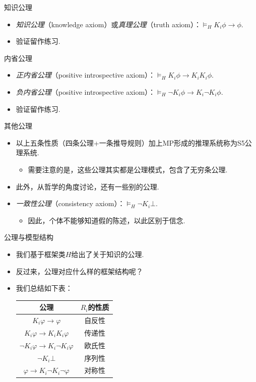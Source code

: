 \begin{frame}{知识公理}
\begin{itemize}
    \item \emph{知识公理}（knowledge axiom）或\emph{真理公理}（truth axiom）：$\vDash_H K_i\phi\to\phi$.
    \item 验证留作练习. %
\end{itemize}
\end{frame}
\begin{frame}{内省公理}
\begin{itemize}
    \item \emph{正内省公理}（positive introspective axiom）：$\vDash_H K_i\phi\to K_iK_i\phi$.
    \item \emph{负内省公理}（positive introspective axiom）：$\vDash_H \neg K_i\phi\to K_i\neg K_i\phi$.
    \item 验证留作练习. %
\end{itemize}
\end{frame}
\begin{frame}{其他公理}
\begin{itemize}
    \item 以上五条性质（四条公理+一条推导规则）加上MP形成的推理系统称为S5公理系统.
    \begin{itemize}
        \item 需要注意的是，这些公理其实都是公理模式，包含了无穷条公理.
    \end{itemize}
    \item 此外，从哲学的角度讨论，还有一些别的公理.
    \item \emph{一致性公理}（consistency axiom）：$\vDash_H\neg K_i\bot$.
    \begin{itemize}
        \item 因此，个体不能够知道假的陈述，以此区别于信念.
    \end{itemize}
\end{itemize}
\end{frame}
\begin{frame}{公理与模型结构}
\begin{itemize}
    \item 我们基于框架类$H$给出了关于知识的公理.
    \item 反过来，公理对应什么样的框架结构呢？
    \item 我们总结如下表：
    \begin{table}[ht]
        \centering
       \begin{tabular}{cc}
\toprule 公理 &  $R_i$的性质 \\
\midrule $K_i \varphi \to \varphi$ & 自反性 \\
$K_i \varphi \to K_i K_i \varphi$ & 传递性 \\
$\neg K_i \varphi \to K_i \neg K_i \varphi$ & 欧氏性 \\
$\neg K_i\bot$  & 序列性\\
$\varphi \to K_i \neg K_i \neg \varphi$ & 对称性 \\
\bottomrule
\end{tabular}
    \end{table}
\end{itemize}
\end{frame}

